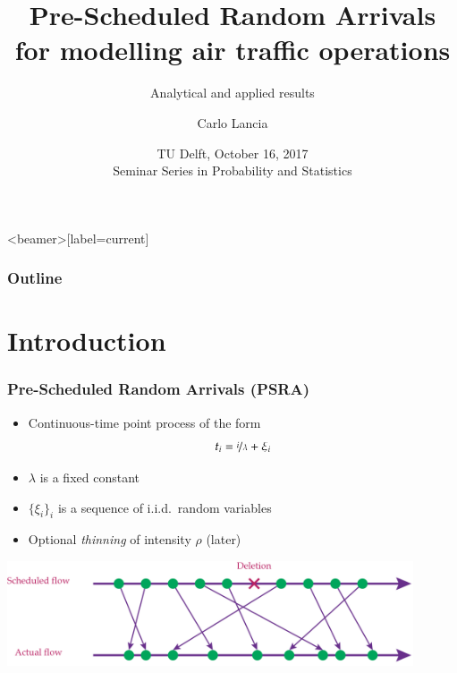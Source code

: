 \documentclass[table,aspectratio=169]{beamer}
\title[Pre-Scheduled Random Arrivals]
{Pre-Scheduled Random Arrivals for modelling air traffic operations}
\subtitle{Analytical and applied results}
\author[Carlo Lancia]{Carlo Lancia}
\institute[Leiden Univ.]{Mathematical Institute Leiden University}
\date[TU Delft Prob \& Stats Seminar]{TU Delft, October 16, 2017\\Seminar Series in Probability and Statistics}
\begin{document}
\maketitle


\begin{frame}<beamer>[label=current]
    \frametitle{Outline}
    \tableofcontents[hideallsubsections]
\end{frame}

\section{Introduction}

\begin{frame}[t]\frametitle{Pre-Scheduled Random Arrivals (PSRA)}
    \begin{itemize}
        \item Continuous-time point process of the form
        \[t_i = \nicefrac{i}{\lambda} + \xi_i\]
        \item $\lambda$ is a fixed constant
        \item $\{\xi_i\}_i$ is a sequence of i.i.d.\ random variables
        \item Optional \emph{thinning} of intensity $\rho$ (later)
    \end{itemize}
    \vfill
    \centering
    \includegraphics[width= 0.9\textwidth]{psra-1}
\end{frame}
\end{document}
